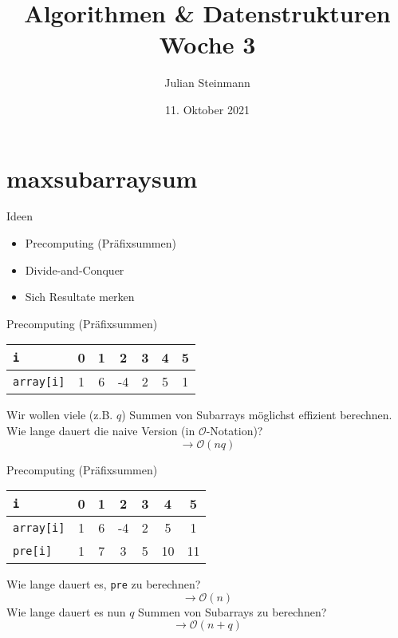 \documentclass[aspectratio=169]{beamer}
\title{Algorithmen \& Datenstrukturen \\ Woche 3}
\date{11. Oktober 2021}
\author{Julian Steinmann}
\institute{ETH Zürich}
\begin{document}
    \maketitle

    \section{maxsubarraysum}
    \begin{frame}{Ideen}
        \begin{itemize}
            \item Precomputing (Präfixsummen)
            \item Divide-and-Conquer
            \item Sich Resultate merken
        \end{itemize}
    \end{frame}
    \begin{frame}{Precomputing (Präfixsummen)}
        \begin{center}
            \begin{tabular}{l*{6}{c}}
                \toprule
                \texttt{i} & 0 & 1 & 2 & 3 & 4 & 5 \\
                \midrule
                \texttt{array[i]} & 1 & 6 & -4 & 2 & 5 & 1\\
                \bottomrule
            \end{tabular}
        \end{center}
        Wir wollen viele (z.B. \(q\)) Summen von Subarrays möglichst effizient 
        berechnen. Wie lange dauert die naive Version (in \(\mathcal{O}\)-Notation)? \pause
        \[\rightarrow \mathcal{O}(nq)\]
    \end{frame}
    \begin{frame}{Precomputing (Präfixsummen)}
        \begin{center}
            \begin{tabular}{l*{6}{c}}
                \toprule
                \texttt{i} & 0 & 1 & 2 & 3 & 4 & 5 \\
                \midrule
                \texttt{array[i]} & 1 & 6 & -4 & 2 & 5 & 1 \\
                \texttt{pre[i]} & 1 & 7 & 3 & 5 & 10 & 11 \\
                \bottomrule
            \end{tabular}
        \end{center}
        Wie lange dauert es, \texttt{pre} zu berechnen?
        \pause \[\rightarrow \mathcal{O}(n)\]
        Wie lange dauert es nun \(q\) Summen von Subarrays zu berechnen?
        \pause \[\rightarrow \mathcal{O}(n + q)\]
    \end{frame}
\end{document}

